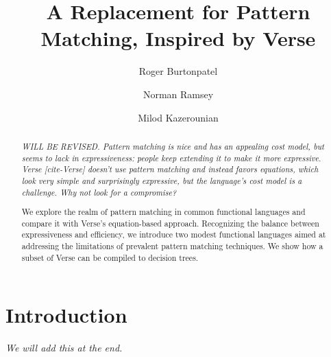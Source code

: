\documentclass[manuscript,screen,review, 12pt]{acmart}
\begin{document}
\title{A Replacement for Pattern Matching, Inspired by Verse}

\author{Roger Burtonpatel}

\author{Norman Ramsey}

\author{Milod Kazerounian}

\renewcommand{\shortauthors}{Burtonpatel et al.}

\begin{abstract}
    \it{WILL BE REVISED.}
  Pattern matching is nice and has an appealing cost model, but seems to lack in
  expressiveness: people keep extending it to make it more expressive. Verse
  [cite-Verse] doesn't use pattern matching and instead favors equations, which
  look very simple and surprisingly expressive, but the language's cost model is
  a challenge. Why not look for a compromise? 
  

  We explore the realm of pattern matching in common functional languages and
  compare it with Verse's equation-based approach. Recognizing the balance
  between expressiveness and efficiency, we introduce two modest functional
  languages aimed at addressing the limitations of prevalent pattern matching
  techniques. We show how a subset of Verse can be compiled to decision trees. 

  \end{abstract}

\maketitle

\section{Introduction}
\it{We will add this at the end.}
\end{document}
